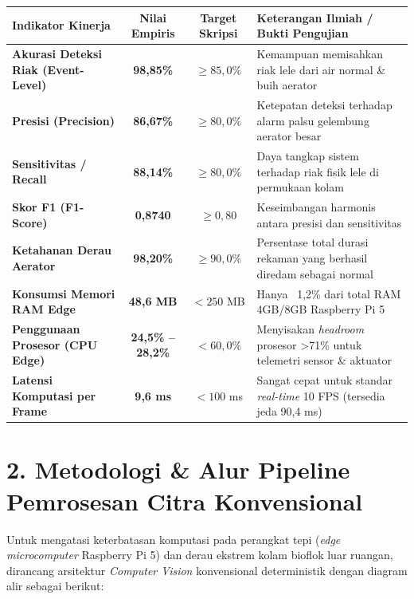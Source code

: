 \documentclass[10pt,a4paper]{article}
\begin{document}
\begin{table}[h!]
\centering
\small
\begin{tabular}{|l|c|c|p{8.5cm}|}
\hline
\textbf{Indikator Kinerja} & \textbf{Nilai Empiris} & \textbf{Target Skripsi} & \textbf{Keterangan Ilmiah / Bukti Pengujian} \\
\hline
\textbf{Akurasi Deteksi Riak (Event-Level)} & \textbf{98,85\%} & $\ge 85,0\%$ & Kemampuan memisahkan riak lele dari air normal \& buih aerator \\
\textbf{Presisi (Precision)} & \textbf{86,67\%} & $\ge 80,0\%$ & Ketepatan deteksi terhadap alarm palsu gelembung aerator besar \\
\textbf{Sensitivitas / Recall} & \textbf{88,14\%} & $\ge 80,0\%$ & Daya tangkap sistem terhadap riak fisik lele di permukaan kolam \\
\textbf{Skor F1 (F1-Score)} & \textbf{0,8740} & $\ge 0,80$ & Keseimbangan harmonis antara presisi dan sensitivitas \\
\textbf{Ketahanan Derau Aerator} & \textbf{98,20\%} & $\ge 90,0\%$ & Persentase total durasi rekaman yang berhasil diredam sebagai normal \\
\textbf{Konsumsi Memori RAM Edge} & \textbf{48,6 MB} & $< 250$ MB & Hanya ~1,2\% dari total RAM 4GB/8GB Raspberry Pi 5 \\
\textbf{Penggunaan Prosesor (CPU Edge)} & \textbf{24,5\% -- 28,2\%} & $< 60,0\%$ & Menyisakan \textit{headroom} prosesor >71\% untuk telemetri sensor \& aktuator \\
\textbf{Latensi Komputasi per Frame} & \textbf{9,6 ms} & $< 100$ ms & Sangat cepat untuk standar \textit{real-time} 10 FPS (tersedia jeda 90,4 ms) \\
\hline
\end{tabular}
\end{table}

\vspace{-4pt}

\section*{2. Metodologi \& Alur Pipeline Pemrosesan Citra Konvensional}

Untuk mengatasi keterbatasan komputasi pada perangkat tepi (\textit{edge microcomputer} Raspberry Pi 5) dan derau ekstrem kolam bioflok luar ruangan, dirancang arsitektur \textit{Computer Vision} konvensional deterministik dengan diagram alir sebagai berikut:
\end{document}
